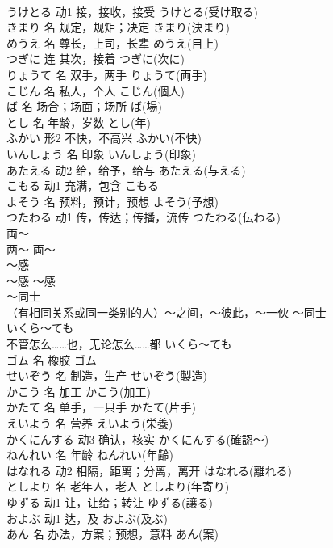 \documentclass[8pt]{extreport}
\begin{document}
\begin{CJK}{UTF8}{min}
\\	うけとる	动1	接，接收，接受	うけとる(受け取る)	
\\	きまり	名	规定，规矩；决定	きまり(決まり)	
\\	めうえ	名	尊长，上司，长辈	めうえ(目上)	
\\	つぎに	连	其次，接着	つぎに(次に)	
\\	りょうて	名	双手，两手	りょうて(両手)	
\\	こじん	名	私人，个人	こじん(個人)	
\\	ば	名	场合；场面；场所	ば(場)	
\\	とし	名	年龄，岁数	とし(年)	
\\	ふかい	形2	不快，不高兴	ふかい(不快)	
\\	いんしょう	名	印象	いんしょう(印象)	
\\	あたえる	动2	给，给予，给与	あたえる(与える)	
\\	こもる	动1	充满，包含	こもる	
\\	よそう	名	预料，预计，预想	よそう(予想)	
\\	つたわる	动1	传，传达；传播，流传	つたわる(伝わる)	
\\	両～	
\\	两～	両～	
\\	～感	
\\	～感	～感	
\\	～同士	
\\	（有相同关系或同一类别的人）～之间，～彼此，～一伙	～同士	
\\	いくら～ても	
\\	不管怎么……也，无论怎么……都	いくら～ても	
\\	ゴム	名	橡胶	ゴム	
\\	せいぞう	名	制造，生产	せいぞう(製造)	
\\	かこう	名	加工	かこう(加工)	
\\	かたて	名	单手，一只手	かたて(片手)	
\\	えいよう	名	营养	えいよう(栄養)	
\\	かくにんする	动3	确认，核实	かくにんする(確認～)	
\\	ねんれい	名	年龄	ねんれい(年齢)	
\\	はなれる	动2	相隔，距离；分离，离开	はなれる(離れる)	
\\	としより	名	老年人，老人	としより(年寄り)	
\\	ゆずる	动1	让，让给；转让	ゆずる(譲る)	
\\	およぶ	动1	达，及	およぶ(及ぶ)	
\\	あん	名	办法，方案；预想，意料	あん(案)	

\end{CJK}
\end{document}

